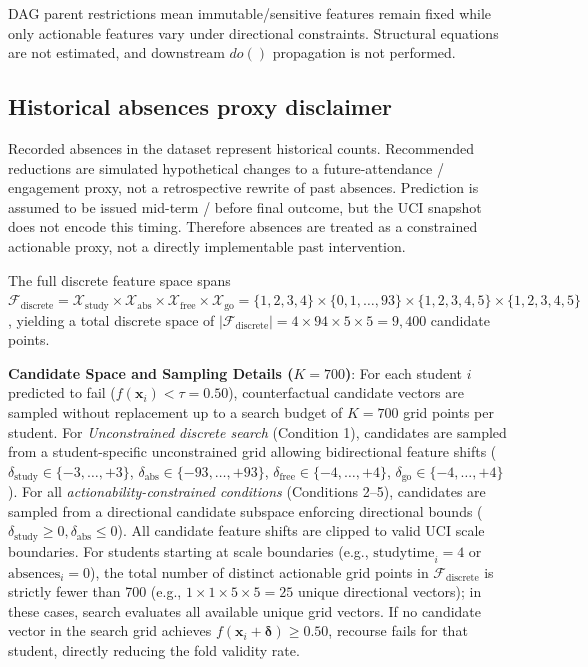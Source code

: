 \documentclass[11pt]{article}
\newcommand{\hlblock}[1]{\vspace{1mm}\noindent\colorbox{yellow!30}{\parbox{\dimexpr\linewidth-2\fboxsep\relax}{\sloppy #1\par}}\vspace{1mm}}
\begin{document}
\hlblock{DAG parent restrictions mean immutable/sensitive features remain fixed while only actionable features vary under directional constraints. Structural equations are not estimated, and downstream $do()$ propagation is not performed.}

\subsection{Historical absences proxy disclaimer}
\label{subsec:absences_proxy}

\hlblock{Recorded absences in the dataset represent historical counts. Recommended reductions are simulated hypothetical changes to a future-attendance / engagement proxy, not a retrospective rewrite of past absences. Prediction is assumed to be issued mid-term / before final outcome, but the UCI snapshot does not encode this timing. Therefore absences are treated as a constrained actionable proxy, not a directly implementable past intervention.}

The full discrete feature space spans $\mathcal{F}_{\text{discrete}} = \mathcal{X}_{\text{study}} \times \mathcal{X}_{\text{abs}} \times \mathcal{X}_{\text{free}} \times \mathcal{X}_{\text{go}} = \{1,2,3,4\} \times \{0,1,\dots,93\} \times \{1,2,3,4,5\} \times \{1,2,3,4,5\}$, yielding a total discrete space of $|\mathcal{F}_{\text{discrete}}| = 4 \times 94 \times 5 \times 5 = 9,400$ candidate points. 

\textbf{Candidate Space and Sampling Details ($K=700$)}: For each student $i$ predicted to fail ($f(\mathbf{x}_i) < \tau=0.50$), counterfactual candidate vectors are sampled without replacement up to a search budget of $K=700$ grid points per student. For \textit{Unconstrained discrete search} (Condition 1), candidates are sampled from a student-specific unconstrained grid allowing bidirectional feature shifts ($\delta_{\text{study}} \in \{-3,\dots,+3\}$, $\delta_{\text{abs}} \in \{-93,\dots,+93\}$, $\delta_{\text{free}} \in \{-4,\dots,+4\}$, $\delta_{\text{go}} \in \{-4,\dots,+4\}$). For all \textit{actionability-constrained conditions} (Conditions 2--5), candidates are sampled from a directional candidate subspace enforcing directional bounds ($\delta_{\text{study}} \ge 0, \delta_{\text{abs}} \le 0$). All candidate feature shifts are clipped to valid UCI scale boundaries. For students starting at scale boundaries (e.g., $\text{studytime}_i = 4$ or $\text{absences}_i = 0$), the total number of distinct actionable grid points in $\mathcal{F}_{\text{discrete}}$ is strictly fewer than 700 (e.g., $1 \times 1 \times 5 \times 5 = 25$ unique directional vectors); in these cases, search evaluates all available unique grid vectors. If no candidate vector in the search grid achieves $f(\mathbf{x}_i + \boldsymbol{\delta}) \ge 0.50$, recourse fails for that student, directly reducing the fold validity rate.
\end{document}
